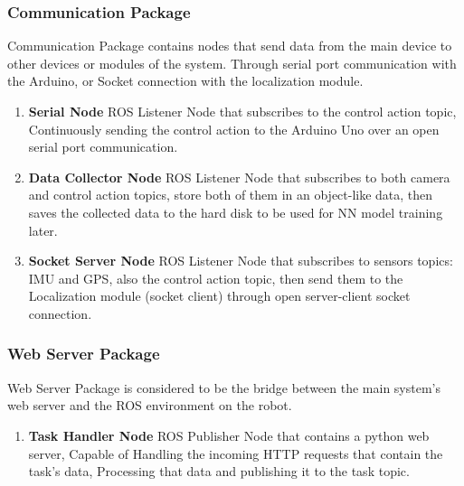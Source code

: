 \subsubsection{Communication Package}
\hspace{2cm}Communication Package contains nodes that send data from the main device to other devices or modules of the system. Through serial port communication with the Arduino, or Socket connection with the localization module.
\begin{enumerate}
    \item \textbf{Serial Node}\newline
        ROS Listener Node that subscribes to the control action topic, Continuously sending the control action to the Arduino Uno over an open serial port communication.
    \item \textbf{Data Collector Node}\newline
        ROS Listener Node that subscribes to both camera and control action topics, store both of them in an object-like data, then saves the collected data to the hard disk to be used for NN model training later.
    \item \textbf{Socket Server Node}\newline
        ROS Listener Node that subscribes to sensors topics: IMU and GPS, also the control action topic, then send them to the Localization module (socket client) through open server-client socket connection.
\end{enumerate}

\subsubsection{Web Server Package}
\hspace{2cm}Web Server Package is considered to be the bridge between the main system's web server and the ROS environment on the robot.

\begin{enumerate}
    \item \textbf{Task Handler Node}\newline
    ROS Publisher Node that contains a python web server, Capable of Handling the incoming HTTP requests that contain the task's data, Processing that data and publishing it to the task topic.
\end{enumerate}